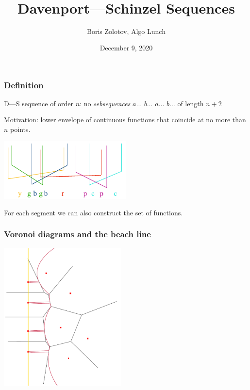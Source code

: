 \documentclass[aspectratio=1610,12pt,notheorems]{beamer}
\title{\bfseries Davenport—Schinzel Sequences}
\author{Boris Zolotov, Algo Lunch}
\institute[\ ]{\ }
\date{December 9, 2020}
\begin{document}
\frame{\titlepage}

\begin{frame} \frametitle{Definition}

\begin{block}{\vspace*{-3ex}}
	D—S sequence of order $n$: no {\it sebsequences} $a \ldots$ $b\ldots$ $a \ldots$ $b\ldots$ of length $n+2$
\end{block}

	Motivation: lower envelope of continuous functions that coincide at no more than $n$ points.

\begin{center}
	\includegraphics[width=0.5\textwidth]{algolunch/ds-segments}
\end{center}

	For each segment we can also construct the set of functions. \vspace{1cm}

\end{frame}

\begin{frame} \frametitle{Voronoi diagrams and the beach line}
\begin{center}
	\includegraphics[width=0.48\textwidth]{algolunch/example}
\end{center}
\end{frame}
\end{document}
